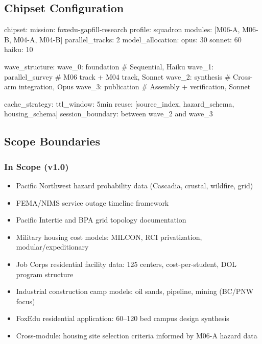 \documentclass[11pt,letterpaper]{article}
\begin{document}
\subsection{Chipset Configuration}

\begin{asciibox}
chipset:
  mission: foxedu-gapfill-research
  profile: squadron
  modules: [M06-A, M06-B, M04-A, M04-B]
  parallel_tracks: 2
  model_allocation:
    opus:   30%
    sonnet: 60%
    haiku:  10%

  wave_structure:
    wave_0: foundation          # Sequential, Haiku
    wave_1: parallel_survey     # M06 track + M04 track, Sonnet
    wave_2: synthesis           # Cross-arm integration, Opus
    wave_3: publication         # Assembly + verification, Sonnet

  cache_strategy:
    ttl_window: 5min
    reuse: [source_index, hazard_schema, housing_schema]
    session_boundary: between wave_2 and wave_3
\end{asciibox}

\subsection{Scope Boundaries}

\subsubsection{In Scope (v1.0)}
\begin{itemize}[leftmargin=1.5em]
  \item Pacific Northwest hazard probability data (Cascadia, crustal, wildfire, grid)
  \item FEMA/NIMS service outage timeline framework
  \item Pacific Intertie and BPA grid topology documentation
  \item Military housing cost models: MILCON, RCI privatization, modular/expeditionary
  \item Job Corps residential facility data: 125 centers, cost-per-student, DOL program structure
  \item Industrial construction camp models: oil sands, pipeline, mining (BC/PNW focus)
  \item FoxEdu residential application: 60--120 bed campus design synthesis
  \item Cross-module: housing site selection criteria informed by M06-A hazard data
\end{itemize}
\end{document}

